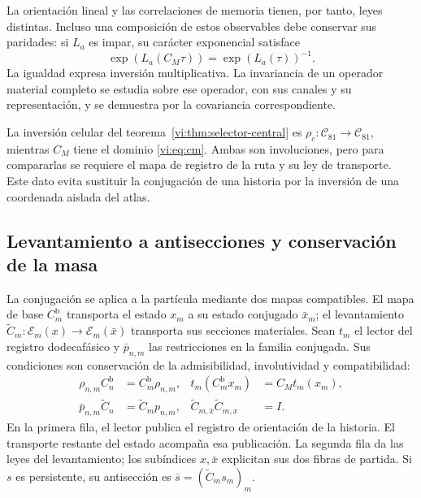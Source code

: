 La orientación lineal y las correlaciones de memoria tienen, por tanto,
leyes distintas. Incluso una composición de estos observables debe
conservar sus paridades: si $L_a$ es impar, su carácter exponencial
satisface
\begin{equation}
 \exp(L_a(C_M\tau))=\exp(L_a(\tau))^{-1}.
 \label{vi:eq:caracter-inverso}
\end{equation}
La igualdad expresa inversión multiplicativa. La invariancia de un
operador material completo se estudia sobre ese operador, con sus
canales y su representación, y se demuestra por la covariancia
correspondiente.

La inversión celular del teorema~\ref{vi:thm:selector-central} es
$\rho_c:\mathcal C_{81}\to\mathcal C_{81}$, mientras $C_M$ tiene
el dominio \eqref{vi:eq:cm}. Ambas son involuciones, pero para
compararlas se requiere el mapa de registro de la ruta y su ley de
transporte. Este dato evita sustituir la conjugación de una historia
por la inversión de una coordenada aislada del atlas.

\subsection{Levantamiento a antisecciones y conservación de la masa}
\label{vi:subsec:antisecciones}

La conjugación se aplica a la partícula mediante dos mapas
compatibles. El mapa de base $C_m^{\mathrm b}$ transporta el estado
$x_m$ a su estado conjugado $\bar x_m$; el levantamiento
$\widetilde C_m:\mathscr E_m(x)\to\mathscr E_m(\bar x)$
transporta sus secciones materiales. Sean $t_m$ el lector del
registro dodecafásico y $\bar p_{n,m}$ las restricciones en la
familia conjugada. Sus condiciones son conservación de la
admisibilidad, involutividad y compatibilidad:
\begin{equation}
 \begin{aligned}
 \rho_{n,m}C_n^{\mathrm b}&=C_m^{\mathrm b}\rho_{n,m},
 &t_m(C_m^{\mathrm b}x_m)&=C_Mt_m(x_m),\\
 \bar p_{n,m}\widetilde C_n&=\widetilde C_mp_{n,m},
 &\widetilde C_{m,\bar x}\widetilde C_{m,x}&=I.
 \end{aligned}
 \label{vi:eq:levantamiento-cm}
\end{equation}
En la primera fila, el lector publica el registro de orientación
de la historia. El transporte restante del estado acompaña esa
publicación. La segunda fila da las leyes del levantamiento;
los subíndices $x,\bar x$ explicitan sus dos fibras de partida.
Si $s$ es persistente, su antisección es
$\bar s=(\widetilde C_ms_m)_m$.

